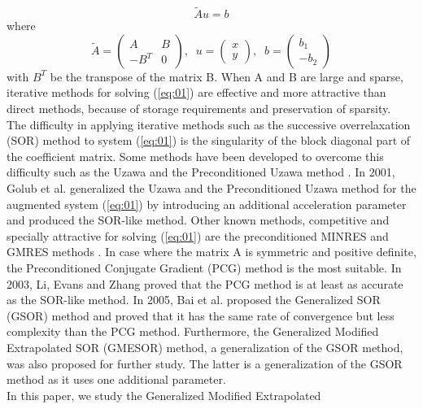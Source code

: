 \documentclass{report}
\begin{document}
\begin{equation}
\tilde Au=b\label{eq:01}
\end{equation}
where
\begin{equation}\label{eq:02}
\tilde A=\left(
\begin{array}{cc}
A & B\\
-B^{T} & 0
\end{array}
\right), \;\; u=
\left(
\begin{array}{cc}
x\\
y
\end{array}
\right),\;\; b=
\left(
\begin{array}{cc}
b_1\\
-b_2
\end{array}
\right)
\end{equation}
with $B^T$ be the transpose of the matrix B.
When A and B are large and sparse, iterative methods for solving
(\ref{eq:01}) are effective and more attractive than direct methods,
because of storage requirements and preservation of sparsity.
\\ \noindent The difficulty in applying iterative methods such as the
successive overrelaxation (SOR) method \cite{Young} to system
(\ref{eq:01}) is the singularity of the block diagonal part of the
coefficient matrix. Some methods have been developed to overcome this
difficulty such as the Uzawa and the Preconditioned Uzawa method
\cite{ArHurUz58}. In 2001, Golub et al. \cite{GolWuYuan2001} generalized
the Uzawa and the Preconditioned Uzawa method for the augmented system
(\ref{eq:01}) by introducing an additional acceleration parameter and
produced the SOR-like method. Other known methods, competitive and
specially attractive for solving (\ref{eq:01}) are the preconditioned
MINRES and GMRES methods \cite{FiRaSiWa98}. In case where the matrix A is
symmetric and positive definite, the Preconditioned Conjugate Gradient
(PCG) method \cite{HestSt52} is the most suitable. In 2003, Li, Evans and
Zhang \cite{LiEvansZha2003} proved that the PCG method is at least as
accurate as the SOR-like method. In 2005, Bai et al.
\cite{BaiParlWang2005} proposed the Generalized SOR (GSOR) method and
proved that it has the same rate of convergence but less complexity than
the PCG method. Furthermore, the Generalized Modified Extrapolated SOR
(GMESOR) method, a generalization of the GSOR method, was also proposed
for further study.
The latter is a generalization of the GSOR method as it uses one additional parameter. \\
\noindent In this paper, we study the Generalized Modified Extrapolated
\end{document}
